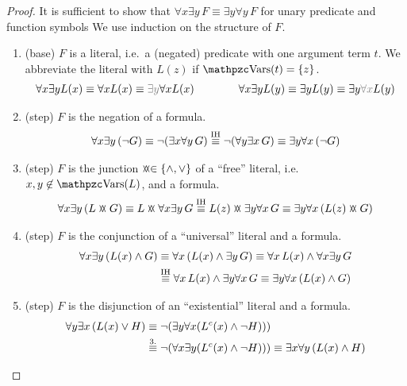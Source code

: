\begin{proof} It is sufficient to show  
	that $\forall x\exists y\,F\equiv\exists y\forall y\,F$
	for unary predicate and function symbols
	We use induction on the structure of $F$.
	\begin{enumerate}
		\item (base) $F$ is a literal,
		i.e.~a (negated) predicate with one argument term $t$.
		We abbreviate the literal with $L(z)$ if $\var(t) = \{ z \}$. 
		\begin{gather*}
			\forall x \exists y L(x)  \equiv \forall x L(x) \equiv {\colG \exists y} \forall x L(x)
			\qquad\qquad
			\forall x \exists y L(y)  \equiv \exists y L(y) \equiv \exists y{\colG \forall x}  L(y)
		\end{gather*}
		\item (step) $F$ is the negation of a formula.
		\begin{gather*}
		\forall x \exists y\, (\lnot G) 
		\equiv \lnot (\exists x \forall y\, G)
		\defEV[IH] \lnot (\forall y\exists x \, G) 
		\equiv \exists y \forall x\, (\lnot G)
		\end{gather*}
		\item (step) $F$ is the junction $\landlor\in\{\land,\lor\}$ of a “free” literal, i.e.~$x,y\not\in\var(L)$, and a formula.
		\begin{gather*}
		\forall x\exists y\,( L \landlor G) 
		\equiv L \landlor \forall x\exists y\, G
		\defEV[IH]L(z) \landlor \exists y\forall x\, G
		\equiv\exists y\forall x\,( L(z) \landlor G )
		\end{gather*}
		\item (step) $F$ is the conjunction of a “universal” literal and a formula.
		\begin{align*}
		\forall x \exists y\,({L(x)\land G}) 
		&\equiv \forall x\,({L(x)} \land \exists y\,G)
		\equiv \forall x\,L(x)\land \forall x\exists y\,G
		\\&\defEV[IH] \forall x\,{L(x)} \land \exists y\forall x\,G
		\equiv\exists y \forall x\,({L(x)\land G})
		\end{align*}
		\item (step) $F$ is the disjunction of an “existential” literal and a formula.
		\begin{align*}
		\forall y \exists x\,({L(x)\lor H}) 
		&\equiv\lnot(\exists y \forall x (L^c(x)\land\lnot H)))\\
		&\defEV[3.]\lnot(\forall x\exists y  (L^c(x)\land\lnot H))) 
		\equiv \exists x\forall y\, (L(x) \land H)

\end{align*}
\end{enumerate}
\end{proof}
